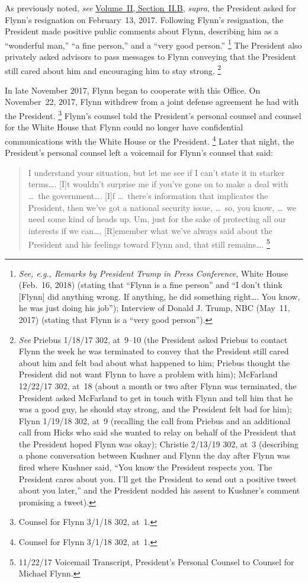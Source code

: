 As previously noted, \textit{see} \hyperlink{subsection.2.2.2}{Volume~II, Section~II.B}, \textit{supra}, the President asked for Flynn's resignation on February~13, 2017.
Following Flynn's resignation, the President made positive public comments about Flynn, describing him as a ``wonderful man,'' ``a fine person,'' and a ``very good person.''%
\footnote{\textit{See, e.g., Remarks by President Trump in Press Conference}, White House (Feb.~16, 2018) (stating that ``Flynn is a fine person'' and ``I don't think [Flynn] did anything wrong.
If anything, he did something right\dots. You know, he was just doing his job'');
Interview of Donald J. Trump, NBC (May~11, 2017) (stating that Flynn is a ``very good person'').}
The President also privately asked advisors to pass messages to Flynn conveying that the President still cared about him and encouraging him to stay strong.%
\footnote{\textit{See} Priebus 1/18/17 302, at~9--10 (the President asked Priebus to contact Flynn the week he was terminated to convey that the President still cared about him and felt bad about what happened to him;
Priebus thought the President did not want Flynn to have a problem with him);
McFarland 12/22/17 302, at~18 (about a month or two after Flynn was terminated, the President asked McFarland to get in touch with Flynn and tell him that he was a good guy, he should stay strong, and the President felt bad for him);
Flynn 1/19/18 302, at~9 (recalling the call from Priebus and an additional call from Hicks who said she wanted to relay on behalf of the President that the President hoped Flynn was okay);
Christie 2/13/19 302, at~3 (describing a phone conversation between Kushner and Flynn the day after Flynn was fired where Kushner said, ``You know the President respects you.
The President cares about you.
I'll get the President to send out a positive tweet about you later,'' and the President nodded his assent to Kushner's comment promising a tweet).}

In late November 2017, Flynn began to cooperate with this Office.
On November~22, 2017, Flynn withdrew from a joint defense agreement he had with the President.%
\footnote{Counsel for Flynn 3/1/18 302, at~1.}
Flynn's counsel told the President's personal counsel and counsel for the White House that Flynn could no longer have confidential communications with the White House or the President.%
\footnote{Counsel for Flynn 3/1/18 302, at~1.}
Later that night, the President's personal counsel left a voicemail for Flynn's counsel that said:

\begin{quote}
I understand your situation, but let me see if I can't state it in starker terms\dots.
[I]t wouldn't surprise me if you've gone on to make a deal with \dots\ the government\dots.
[I]f \dots\ there's information that implicates the President, then we've got a national security issue, \dots\ so, you know, \dots\ we need some kind of heads up.
Um, just for the sake of protecting all our interests if we can\dots.
[R]emember what we've always said about the President and his feelings toward Flynn and, that still remains\dots.%
\footnote{11/22/17 Voicemail Transcript, President's Personal Counsel to Counsel for Michael Flynn.}
\end{quote}

